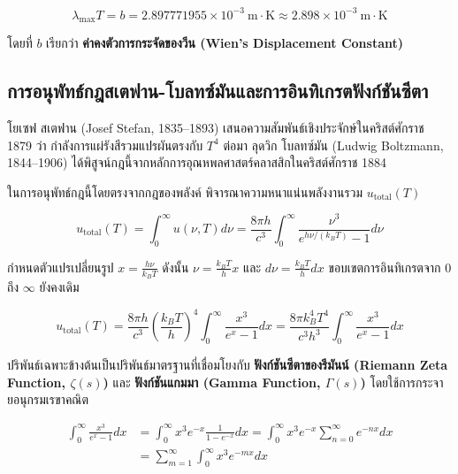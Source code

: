 \begin{equation}
\lambda_{\max} T = b = 2.897771955 \times 10^{-3}~\text{m}\cdot\text{K} \approx 2.898 \times 10^{-3}~\text{m}\cdot\text{K}
\label{eq:wien_law_derived}
\end{equation}

โดยที่ $b$ เรียกว่า \textbf{ค่าคงตัวการกระจัดของวีน (Wien's Displacement Constant)}

\subsection{การอนุพัทธ์กฎสเตฟาน-โบลทซ์มันและการอินทิเกรตฟังก์ชันซีตา}

โยเซฟ สเตฟาน (Josef Stefan, 1835--1893) เสนอความสัมพันธ์เชิงประจักษ์ในคริสต์ศักราช 1879 ว่า กำลังการแผ่รังสีรวมแปรผันตรงกับ $T^4$ ต่อมา ลุดวิก โบลทซ์มัน (Ludwig Boltzmann, 1844--1906) ได้พิสูจน์กฎนี้จากหลักการอุณหพลศาสตร์คลาสสิกในคริสต์ศักราช 1884

ในการอนุพัทธ์กฎนี้โดยตรงจากกฎของพลังค์ พิจารณาความหนาแน่นพลังงานรวม $u_{\text{total}}(T)$

\begin{equation}
u_{\text{total}}(T) = \int_0^\infty u(\nu, T) d\nu = \frac{8\pi h}{c^3} \int_0^\infty \frac{\nu^3}{e^{h\nu/(k_B T)} - 1} d\nu
\label{eq:stefan_integral_start}
\end{equation}

กำหนดตัวแปรเปลี่ยนรูป $x = \frac{h\nu}{k_B T}$ ดังนั้น $\nu = \frac{k_B T}{h}x$ และ $d\nu = \frac{k_B T}{h}dx$ ขอบเขตการอินทิเกรตจาก $0$ ถึง $\infty$ ยังคงเดิม

\begin{equation}
u_{\text{total}}(T) = \frac{8\pi h}{c^3} \left( \frac{k_B T}{h} \right)^4 \int_0^\infty \frac{x^3}{e^x - 1} dx = \frac{8\pi k_B^4 T^4}{c^3 h^3} \int_0^\infty \frac{x^3}{e^x - 1} dx
\label{eq:stefan_substitution}
\end{equation}

ปริพันธ์เฉพาะข้างต้นเป็นปริพันธ์มาตรฐานที่เชื่อมโยงกับ \textbf{ฟังก์ชันซีตาของรีมันน์ (Riemann Zeta Function, $\zeta(s)$)} และ \textbf{ฟังก์ชันแกมมา (Gamma Function, $\Gamma(s)$)} โดยใช้การกระจายอนุกรมเรขาคณิต

\begin{align}
\int_0^\infty \frac{x^3}{e^x - 1} dx &= \int_0^\infty x^3 e^{-x}\frac{1}{1 - e^{-x}} dx = \int_0^\infty x^3 e^{-x} \sum_{n=0}^\infty e^{-nx} dx \nonumber \\
&= \sum_{m=1}^\infty \int_0^\infty x^3 e^{-mx} dx
\end{align}


